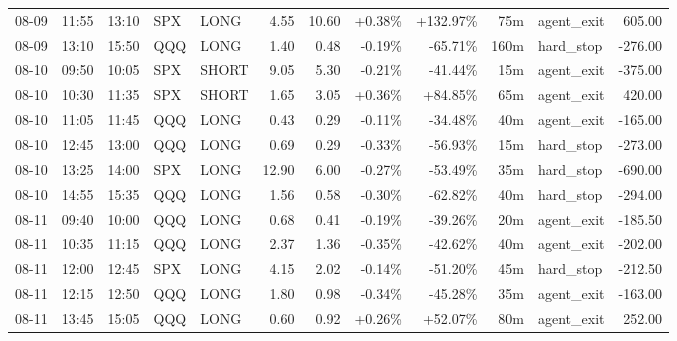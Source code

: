 \documentclass[11pt,a4paper,twoside]{article}
\begin{document}
\begin{center}
\begin{longtable}{>{\color{txtmain}}l l l l l r r r r r >{\color{txtmain}}l r}
08-09 & 11:55 & 13:10 & SPX & LONG & 4.55 & 10.60 & \textcolor{wingreen}{+0.38\%} & \textcolor{wingreen}{+132.97\%} & 75m & agent\_exit & \textcolor{wingreen}{605.00} \\
08-09 & 13:10 & 15:50 & QQQ & LONG & 1.40 & 0.48 & \textcolor{lossred}{-0.19\%} & \textcolor{lossred}{-65.71\%} & 160m & hard\_stop & \textcolor{lossred}{-276.00} \\
08-10 & 09:50 & 10:05 & SPX & SHORT & 9.05 & 5.30 & \textcolor{lossred}{-0.21\%} & \textcolor{lossred}{-41.44\%} & 15m & agent\_exit & \textcolor{lossred}{-375.00} \\
08-10 & 10:30 & 11:35 & SPX & SHORT & 1.65 & 3.05 & \textcolor{wingreen}{+0.36\%} & \textcolor{wingreen}{+84.85\%} & 65m & agent\_exit & \textcolor{wingreen}{420.00} \\
08-10 & 11:05 & 11:45 & QQQ & LONG & 0.43 & 0.29 & \textcolor{lossred}{-0.11\%} & \textcolor{lossred}{-34.48\%} & 40m & agent\_exit & \textcolor{lossred}{-165.00} \\
08-10 & 12:45 & 13:00 & QQQ & LONG & 0.69 & 0.29 & \textcolor{lossred}{-0.33\%} & \textcolor{lossred}{-56.93\%} & 15m & hard\_stop & \textcolor{lossred}{-273.00} \\
08-10 & 13:25 & 14:00 & SPX & LONG & 12.90 & 6.00 & \textcolor{lossred}{-0.27\%} & \textcolor{lossred}{-53.49\%} & 35m & hard\_stop & \textcolor{lossred}{-690.00} \\
08-10 & 14:55 & 15:35 & QQQ & LONG & 1.56 & 0.58 & \textcolor{lossred}{-0.30\%} & \textcolor{lossred}{-62.82\%} & 40m & hard\_stop & \textcolor{lossred}{-294.00} \\
08-11 & 09:40 & 10:00 & QQQ & LONG & 0.68 & 0.41 & \textcolor{lossred}{-0.19\%} & \textcolor{lossred}{-39.26\%} & 20m & agent\_exit & \textcolor{lossred}{-185.50} \\
08-11 & 10:35 & 11:15 & QQQ & LONG & 2.37 & 1.36 & \textcolor{lossred}{-0.35\%} & \textcolor{lossred}{-42.62\%} & 40m & agent\_exit & \textcolor{lossred}{-202.00} \\
08-11 & 12:00 & 12:45 & SPX & LONG & 4.15 & 2.02 & \textcolor{lossred}{-0.14\%} & \textcolor{lossred}{-51.20\%} & 45m & hard\_stop & \textcolor{lossred}{-212.50} \\
08-11 & 12:15 & 12:50 & QQQ & LONG & 1.80 & 0.98 & \textcolor{lossred}{-0.34\%} & \textcolor{lossred}{-45.28\%} & 35m & agent\_exit & \textcolor{lossred}{-163.00} \\
08-11 & 13:45 & 15:05 & QQQ & LONG & 0.60 & 0.92 & \textcolor{wingreen}{+0.26\%} & \textcolor{wingreen}{+52.07\%} & 80m & agent\_exit & \textcolor{wingreen}{252.00} \\

\end{longtable}
\end{center}
\end{document}
